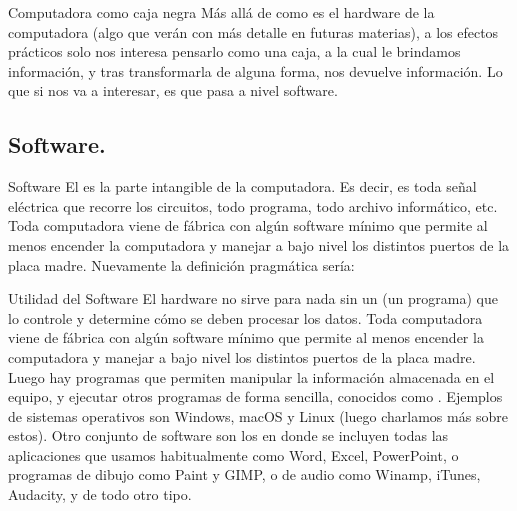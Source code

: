 
\begin{frame}{Computadora como caja negra}
  Más allá de como es el hardware de la computadora (algo que verán
  con más detalle en futuras materias), a los efectos prácticos solo nos
  interesa pensarlo como una caja, a la cual le brindamos información,
  y tras transformarla de alguna forma, nos devuelve información.
  \jump
  \emptyline
  Lo que si nos va a interesar, es que pasa a nivel software.
\end{frame}


\subsection{Software.}


\begin{frame}[shrink]{Software}
  El  es la parte intangible de la computadora. Es decir, es
  toda señal eléctrica que recorre los circuitos, todo programa, todo archivo
  informático, etc.
  \jump
  \\
  Toda computadora viene de fábrica con algún software mínimo que permite al
  menos encender la computadora y manejar a bajo nivel los distintos puertos de
  la placa madre.
  \jump
  Nuevamente la definición pragmática sería:\\
\end{frame}


\begin{frame}[shrink]{Utilidad del Software}
  El hardware no sirve para nada sin un  (un programa) que lo controle y
  determine cómo se deben procesar los datos.
  \jump
  Toda computadora viene de fábrica con algún software mínimo que permite al
  menos encender la computadora y manejar a bajo nivel los distintos puertos de
  la placa madre.
  \jump
  Luego hay programas que permiten manipular la información almacenada
  en el equipo, y ejecutar otros programas de forma sencilla, conocidos
  como . Ejemplos de sistemas operativos
  son Windows, macOS y Linux (luego charlamos más sobre estos).
  \jump
  Otro conjunto de software son los  en
  donde se incluyen todas las aplicaciones que usamos habitualmente como Word,
  Excel, PowerPoint, o programas de dibujo como Paint y GIMP, o de audio como
  Winamp, iTunes, Audacity, y de todo otro tipo.
\end{frame}

